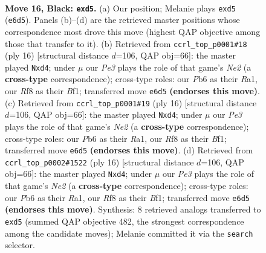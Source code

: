 \documentclass[11pt]{article}
\begin{document}
\clearpage

\begin{figure}[p]\centering
\begin{subfigure}{0.46\textwidth}\centering
\resizebox{\linewidth}{!}{%
\newchessgame
\chessboard[
  setfen={rnbq1rk1/p3b3/1p2p1p1/2nP2P1/P2Q4/2N2N2/1P3P2/R1B1KB1R b KQ - 2 16},
  showmover=false,
  pgfstyle=straightmove, color=movearrow, markmove={e6-d5}
]}
\caption{}
\end{subfigure}\hfill
\begin{subfigure}{0.46\textwidth}\centering
\resizebox{\linewidth}{!}{%
\newchessgame
\chessboard[
  setfen={r1b1k2r/ppp2ppp/2n2n2/3q4/3p4/2B1P3/PP2NPPP/R2QKB1R w KQkq - 2 9},
  showmover=false,
  pgfstyle=straightmove, color=movearrow, markmove={e2-d4}
]}
\caption{}
\end{subfigure}
\\[4pt]
\begin{subfigure}{0.46\textwidth}\centering
\resizebox{\linewidth}{!}{%
\newchessgame
\chessboard[
  setfen={r1b1k2r/ppp2ppp/2n2n2/3q4/3p4/2B1P3/PP2NPPP/R2QKB1R w KQkq - 2 9},
  showmover=false,
  pgfstyle=straightmove, color=movearrow, markmove={e2-d4}
]}
\caption{}
\end{subfigure}\hfill
\begin{subfigure}{0.46\textwidth}\centering
\resizebox{\linewidth}{!}{%
\newchessgame
\chessboard[
  setfen={r1b1k2r/ppp2ppp/2n2n2/3q4/3p4/2B1P3/PP2NPPP/R2QKB1R w KQkq - 2 9},
  showmover=false,
  pgfstyle=straightmove, color=movearrow, markmove={e2-d4}
]}
\caption{}
\end{subfigure}
\caption{\textbf{Move 16, Black: \texttt{exd5}.} (a) Our position; Melanie plays \texttt{exd5} (\texttt{e6d5}). Panels (b)--(d) are the retrieved master positions whose correspondence most drove this move (highest QAP objective among those that transfer to it). (b) Retrieved from \texttt{ccrl\_top\_p0001\#18} (ply 16) [structural distance $d$=106, QAP obj=66]: the master played \texttt{Nxd4}; under $\mu$ our \emph{Pe3} plays the role of that game's \emph{Ne2} (a \textbf{cross-type} correspondence); cross-type roles: our \emph{P}b6 as their \emph{R}a1, our \emph{R}f8 as their \emph{B}f1; transferred move \texttt{e6d5} \textbf{(endorses this move)}. (c) Retrieved from \texttt{ccrl\_top\_p0001\#19} (ply 16) [structural distance $d$=106, QAP obj=66]: the master played \texttt{Nxd4}; under $\mu$ our \emph{Pe3} plays the role of that game's \emph{Ne2} (a \textbf{cross-type} correspondence); cross-type roles: our \emph{P}b6 as their \emph{R}a1, our \emph{R}f8 as their \emph{B}f1; transferred move \texttt{e6d5} \textbf{(endorses this move)}. (d) Retrieved from \texttt{ccrl\_top\_p0002\#1522} (ply 16) [structural distance $d$=106, QAP obj=66]: the master played \texttt{Nxd4}; under $\mu$ our \emph{Pe3} plays the role of that game's \emph{Ne2} (a \textbf{cross-type} correspondence); cross-type roles: our \emph{P}b6 as their \emph{R}a1, our \emph{R}f8 as their \emph{B}f1; transferred move \texttt{e6d5} \textbf{(endorses this move)}. Synthesis: 8 retrieved analogs transferred to \texttt{exd5} (summed QAP objective 482, the strongest correspondence among the candidate moves); Melanie committed it via the \texttt{search} selector.}

\end{figure}
\end{document}
